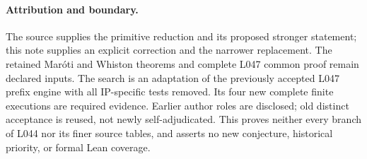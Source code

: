 \documentclass[11pt,a4paper]{article}
\begin{document}
\paragraph{Attribution and boundary.}
The source supplies the primitive reduction and its proposed stronger
statement; this note supplies an explicit correction and the narrower
replacement. The retained Mar\'oti and Whiston theorems and complete
L047 common proof remain declared inputs. The search is an adaptation
of the previously accepted L047 prefix engine with all IP-specific
tests removed. Its four new complete finite executions are required
evidence. Earlier author roles are disclosed; old distinct acceptance
is reused, not newly self-adjudicated. This proves neither every branch
of L044 nor its finer source tables, and asserts no new conjecture,
historical priority, or formal Lean coverage.
\end{document}

